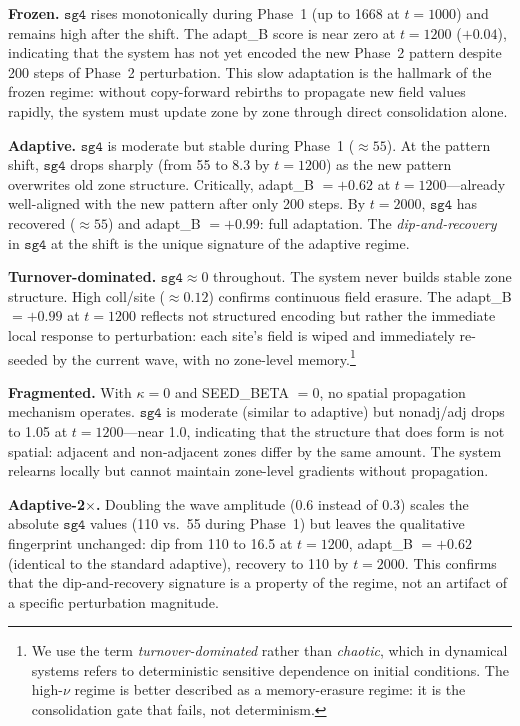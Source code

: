 \documentclass[11pt]{article}
\theoremstyle{remark}
\begin{document}
\textbf{Frozen.} $\mathtt{sg4}$ rises monotonically during Phase~1 (up to 1668
at $t = 1000$) and remains high after the shift. The adapt\_B score is near zero
at $t = 1200$ ($+0.04$), indicating that the system has not yet encoded the new
Phase~2 pattern despite 200 steps of Phase~2 perturbation. This slow adaptation
is the hallmark of the frozen regime: without copy-forward rebirths to propagate
new field values rapidly, the system must update zone by zone through direct
consolidation alone.

\textbf{Adaptive.} $\mathtt{sg4}$ is moderate but stable during Phase~1 ($\approx 55$).
At the pattern shift, $\mathtt{sg4}$ drops sharply (from 55 to 8.3 by $t = 1200$)
as the new pattern overwrites old zone structure. Critically, adapt\_B $= +0.62$
at $t = 1200$---already well-aligned with the new pattern after only 200 steps.
By $t = 2000$, $\mathtt{sg4}$ has recovered ($\approx 55$) and adapt\_B $= +0.99$:
full adaptation. The \emph{dip-and-recovery} in $\mathtt{sg4}$ at the shift is
the unique signature of the adaptive regime.

\textbf{Turnover-dominated.} $\mathtt{sg4} \approx 0$ throughout. The system never
builds stable zone structure. High coll/site ($\approx 0.12$) confirms continuous
field erasure. The adapt\_B $= +0.99$ at $t = 1200$ reflects not structured encoding
but rather the immediate local response to perturbation: each site's field is
wiped and immediately re-seeded by the current wave, with no zone-level memory.\footnote{We
use the term \emph{turnover-dominated} rather than \emph{chaotic}, which in
dynamical systems refers to deterministic sensitive dependence on initial conditions.
The high-$\nu$ regime is better described as a memory-erasure regime: it is the
consolidation gate that fails, not determinism.}

\textbf{Fragmented.} With $\kappa = 0$ and SEED\_BETA $= 0$, no spatial
propagation mechanism operates. $\mathtt{sg4}$ is moderate (similar to adaptive)
but nonadj/adj drops to 1.05 at $t = 1200$---near 1.0, indicating that the
structure that does form is not spatial: adjacent and non-adjacent zones differ
by the same amount. The system relearns locally but cannot maintain zone-level
gradients without propagation.

\textbf{Adaptive-2$\times$.} Doubling the wave amplitude (0.6 instead of 0.3)
scales the absolute $\mathtt{sg4}$ values (110 vs.\ 55 during Phase~1) but
leaves the qualitative fingerprint unchanged: dip from 110 to 16.5 at $t = 1200$,
adapt\_B $= +0.62$ (identical to the standard adaptive), recovery to 110 by $t = 2000$.
This confirms that the dip-and-recovery signature is a property of the regime, not
an artifact of a specific perturbation magnitude.
\end{document}
